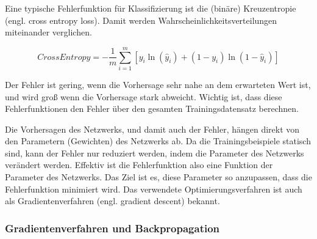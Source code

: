 Eine typische Fehlerfunktion für Klassifizierung ist die (binäre) Kreuzentropie (engl. cross entropy loss). Damit werden Wahrscheinlichkeitsverteilungen miteinander verglichen.

\begin{equation}
    \label{eqn:crossentropy}
    CrossEntropy = -\frac{1}{m}\sum_{i=1}^{m} [y_i\ln(\hat{y}_i)+(1-y_i)\ln(1-\hat{y}_i)]
\end{equation}

Der Fehler ist gering, wenn die Vorhersage sehr nahe an dem erwarteten Wert ist, und wird groß wenn die Vorhersage stark abweicht. Wichtig ist, dass diese Fehlerfunktionen den Fehler über den gesamten Trainingsdatensatz berechnen.\\
\par
Die Vorhersagen des Netzwerks, und damit auch der Fehler, hängen direkt von den Parametern (Gewichten) des Netzwerks ab. Da die Trainingsbeispiele statisch sind, kann der Fehler nur reduziert werden, indem die Parameter des Netzwerks verändert werden. Effektiv ist die Fehlerfunktion also eine Funktion der Parameter des Netzwerks. Das Ziel ist es, diese Parameter so anzupassen, dass die Fehlerfunktion minimiert wird. Das verwendete Optimierungsverfahren ist auch als Gradientenverfahren (engl. gradient descent) bekannt.

\subsubsection{Gradientenverfahren und Backpropagation}

